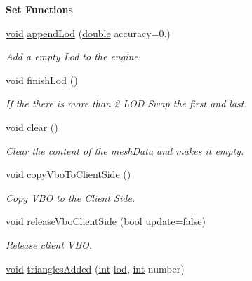 \begin{Indent}{\bf Set Functions}\par
\begin{DoxyCompactItemize}
\item 
\hyperlink{group___u_a_v_objects_plugin_ga444cf2ff3f0ecbe028adce838d373f5c}{void} \hyperlink{class_g_l_c___mesh_data_a2fdea574fe53a3b832a1b7522e7e3cbf}{append\-Lod} (\hyperlink{_super_l_u_support_8h_a8956b2b9f49bf918deed98379d159ca7}{double} accuracy=0.)
\begin{DoxyCompactList}\small\item\em Add a empty Lod to the engine. \end{DoxyCompactList}\item 
\hyperlink{group___u_a_v_objects_plugin_ga444cf2ff3f0ecbe028adce838d373f5c}{void} \hyperlink{class_g_l_c___mesh_data_a90d03a2f011b627971fa19070c82adf4}{finish\-Lod} ()
\begin{DoxyCompactList}\small\item\em If the there is more than 2 L\-O\-D Swap the first and last. \end{DoxyCompactList}\item 
\hyperlink{group___u_a_v_objects_plugin_ga444cf2ff3f0ecbe028adce838d373f5c}{void} \hyperlink{class_g_l_c___mesh_data_a9500c265511eb0996cbf236434d57ac0}{clear} ()
\begin{DoxyCompactList}\small\item\em Clear the content of the mesh\-Data and makes it empty. \end{DoxyCompactList}\item 
\hyperlink{group___u_a_v_objects_plugin_ga444cf2ff3f0ecbe028adce838d373f5c}{void} \hyperlink{class_g_l_c___mesh_data_a663a125720adea4a5656faf7d7d7726c}{copy\-Vbo\-To\-Client\-Side} ()
\begin{DoxyCompactList}\small\item\em Copy V\-B\-O to the Client Side. \end{DoxyCompactList}\item 
\hyperlink{group___u_a_v_objects_plugin_ga444cf2ff3f0ecbe028adce838d373f5c}{void} \hyperlink{class_g_l_c___mesh_data_aa5cf570745f184aac4e9d72dbb6ee85d}{release\-Vbo\-Client\-Side} (bool update=false)
\begin{DoxyCompactList}\small\item\em Release client V\-B\-O. \end{DoxyCompactList}\item 
\hyperlink{group___u_a_v_objects_plugin_ga444cf2ff3f0ecbe028adce838d373f5c}{void} \hyperlink{class_g_l_c___mesh_data_a943d1f417e0bd532d70a9e693d187eea}{triangles\-Added} (\hyperlink{ioapi_8h_a787fa3cf048117ba7123753c1e74fcd6}{int} \hyperlink{glext_8h_a5b5a34b88a28ab9c203c2b432f6168b6}{lod}, \hyperlink{ioapi_8h_a787fa3cf048117ba7123753c1e74fcd6}{int} number)

\end{DoxyCompactItemize}
\end{Indent}
